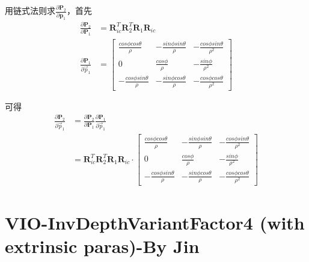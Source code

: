 \documentclass{article}
\begin{document}
用链式法则求$\frac{\partial{\boldsymbol{P}_2}}{\partial{\boldsymbol{p}_1}}$，首先
\begin{equation}
	\begin {aligned}
	\frac{\partial{\boldsymbol{P}_2}}{\partial{\boldsymbol{P}_1}}&=\boldsymbol{R}_{ic}^{T}\boldsymbol{R}_2^{T}\boldsymbol{R}_1\boldsymbol{R}_{ic}
	\\
	\frac{\partial{\boldsymbol{P}_1}}{\partial{\vec{p}_1}}&=
	\left[
		\begin{matrix}
			\frac{cos\phi cos\theta}{\rho}  & -\frac{sin\phi sin\theta}{\rho} & -\frac{cos\phi sin\theta}{\rho^2} \\
			0                               & \frac{cos\phi}{\rho}            & -\frac{sin\phi}{\rho^2}           \\
			-\frac{cos\phi sin\theta}{\rho} & -\frac{sin\phi cos\theta}{\rho} & -\frac{cos\phi cos\theta}{\rho^2} 
		\end{matrix}
	\right]
	\end{aligned}
\end{equation}

可得
\begin{equation}
	\begin{aligned}
		\frac{\partial{\boldsymbol{P}_2}} {\partial{\vec{p}_1}} &=\frac{\partial{\boldsymbol{P}_2}} {\partial{\boldsymbol{P}_1}} \frac{\partial{\boldsymbol{P}_1}} {\partial{\vec{p}_1}} \\
		&= \boldsymbol{R}_{ic}^{T}\boldsymbol{R}_2^{T}\boldsymbol{R}_1\boldsymbol{R}_{ic}\cdot 
		\left[
		\begin{matrix}
		\frac{cos\phi cos\theta}{\rho}  & -\frac{sin\phi sin\theta}{\rho} & -\frac{cos\phi sin\theta}{\rho^2} \\
		0                               & \frac{cos\phi}{\rho}            & -\frac{sin\phi}{\rho^2}           \\
		-\frac{cos\phi sin\theta}{\rho} & -\frac{sin\phi cos\theta}{\rho} & -\frac{cos\phi cos\theta}{\rho^2} 
		\end{matrix}
		\right]
	\end{aligned}
\end{equation}

\section{VIO-InvDepthVariantFactor4 (with extrinsic paras)-By Jin}
\end{document}
